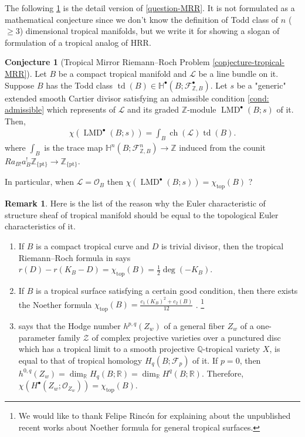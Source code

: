 \documentclass[a4paper,dvipdfmx,reqno,12pt]{amsart}
\theoremstyle{definition}
\newtheorem{conjecture}[theorem]{Conjecture}
\newtheorem{remark}[theorem]{Remark}
\newcommand{\Z}{\mathbb{Z}}%
\newcommand{\mb}[1]{\mathbb{#1}}%
\newcommand{\mcal}[1]{\mathcal{#1}}%
\newcommand{\opn}[1]{\operatorname{#1}}
\newcommand{\myfootnote}[1]{\hspace{-5pt}\footnote{#1}}
\numberwithin{equation}{section}
\begin{document}
The following \cref{conjecture-tropical-MRR-preface}
is the detail version of \cref{question-MRR}.
It is not formulated as a mathematical 
conjecture since we don't know the definition of Todd 
class of $n$ ($\geq 3$) dimensional tropical manifolds,
but we write it for showing a slogan of formulation 
of a tropical analog of HRR.

\begin{conjecture}[{Tropical Mirror Riemann--Roch Problem
\cref{conjecture-tropical-MRR}}]
\label{conjecture-tropical-MRR-preface}
Let $B$ be a compact tropical manifold and $\mcal{L}$
be a line bundle on it. Suppose $B$ has the Todd class
$\opn{td}(B) \in \mb{H}^{\bullet}(B;\mcal{F}_{\Z, B}^{\bullet})$.
 Let $s$ be a "generic"
extended smooth Cartier divisor satisfying an admissible condition 
\cref{cond: admissible} which represents of $\mcal{L}$
and its graded $\Z$-module $\opn{LMD}^{\bullet}(B;s)$
of it. Then,
\begin{align}
\chi(\opn{LMD}^{\bullet}(B;s))=\int_B \opn{ch}(\mcal{L})\opn{td}(B).
\end{align}
where $\int_B$ is the trace map 
$\mb{H}^{n}(B;\mcal{F}_{\Z, B}^{n})\to \Z$
induced from the counit 
$Ra_{B!}a_{B}^{!}\mathbb{Z}_{\{\mathrm{pt}\}}
\to \mathbb{Z}_{\{\mathrm{pt}\}}$.

In particular, when $\mcal{L}=\mcal{O}_B$ then
$\chi(\opn{LMD}^{\bullet}(B;s))=\chi_{\opn{top}}(B)$ ?
\end{conjecture}

\begin{remark}
Here is the list of the reason why the Euler 
characteristic of structure sheaf of tropical manifold
should be equal to the topological Euler characteristics of it.
\begin{enumerate}
\item If $B$ is a compact tropical curve and $D$ 
is trivial divisor, then the tropical Riemann--Roch 
formula in 
\cite{gathmannRiemannRochTheoremTropical2008a}
says $r(D)-r(K_B-D)=\chi_{\opn{top}}(B)=\frac{1}{2}\opn{deg}(-K_B)$. 
\item If $B$ is a tropical surface satisfying a certain 
good condition, then there exists the Noether formula
$\chi_{\opn{top}}(B)=\frac{c_1(K_B)^{2} +c_2(B)}{12}$ 
\cite[Theorem 5.1]{shawTropicalSurfaces2015a}.
\myfootnote{We would like to thank Felipe Rinc\'on 
for explaining about the unpublished recent works
about Noether formula for general tropical surfaces.
}
\item 
\cite[Corollary 2]{itenbergTropicalHomology2019b} says 
that the Hodge number $h^{p,q}(Z_w)$ of a general fiber $Z_w$ of
a one-parameter family $\mathcal{Z}$ of 
complex projective varieties over a punctured disc which 
has a tropical limit to a smooth projective 
$\mathbb{Q}$-tropical variety $X$, 
is equal to that of tropical homology 
$H_{q}(B;\mathcal{F}_p)$ of it. If $p=0$, then
$h^{0,q}(Z_w)=\dim_{\mathbb{R}}H_{q}(B;\mathbb{R})
=\dim_{\mathbb{R}} H^{q}(B;\mathbb{R})$.
Therefore, $\chi(H^{\bullet}(Z_w;\mathcal{O}_{Z_w}))=
\chi_{\opn{top}}(B)$.
\end{enumerate}

\end{remark}
\end{document}
